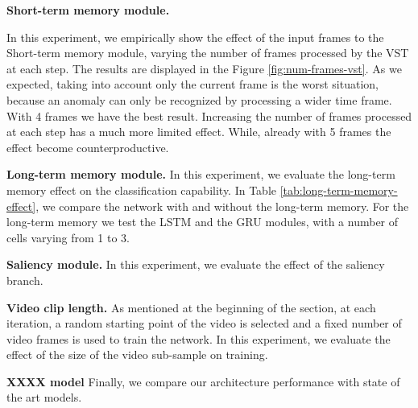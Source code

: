 
\noindent\textbf{Short-term memory module.}

In this experiment, we empirically show the effect of the input frames to the Short-term memory module, varying the number of frames processed by the VST at each step.
The results are displayed in the Figure \ref{fig:num-frames-vst}.
As we expected, taking into account only the current frame is the worst situation, because an anomaly can only be recognized by processing a wider time frame.
With 4 frames we have the best result.
Increasing the number of frames processed at each step has a much more limited effect.
While, already with 5 frames the effect become counterproductive.


\noindent\textbf{Long-term memory module.}
In this experiment, we evaluate the long-term memory effect on the classification capability.
In Table \ref{tab:long-term-memory-effect}, we compare the network with and without the long-term memory.
For the long-term memory we test the LSTM and the GRU modules, with a number of cells varying from 1 to 3.

\noindent\textbf{Saliency module.}
In this experiment, we evaluate the effect of the saliency branch.

\noindent\textbf{Video clip length.}
As mentioned at the beginning of the section, at each iteration, a random starting point of the video is selected and a fixed number of video frames is used to train the network.
In this experiment, we evaluate the effect of the size of the video sub-sample on training.


\noindent\textbf{XXXX model}
Finally, we compare our architecture performance with state of the art models.